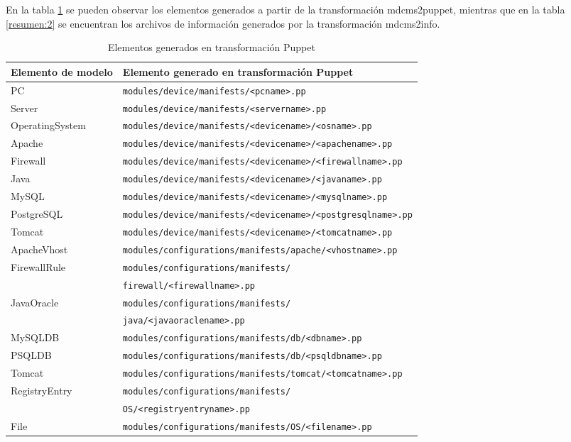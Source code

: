 En la tabla \ref{resumen:1} se pueden observar los elementos generados a partir de la transformación mdcms2puppet, mientras que en la tabla \ref{resumen:2} se encuentran los archivos de información generados por la transformación mdcms2info.
\begin{table}[htbp]
    \begin{adjustwidth}{-0.75in}{-0.5in}
        \centering
        \begin{center}
        \begin{tabular}{ll}
            Elemento de modelo & Elemento generado en transformación Puppet\\
            \hline
            PC & \texttt{modules/device/manifests/<pcname>.pp}\\
           Server & \texttt{modules/device/manifests/<servername>.pp}\\
            OperatingSystem & \texttt{modules/device/manifests/<devicename>/<osname>.pp}\\
           Apache & \texttt{modules/device/manifests/<devicename>/<apachename>.pp}\\
            Firewall & \texttt{modules/device/manifests/<devicename>/<firewallname>.pp}\\
            Java & \texttt{modules/device/manifests/<devicename>/<javaname>.pp}\\
            MySQL & \texttt{modules/device/manifests/<devicename>/<mysqlname>.pp}\\
            PostgreSQL & \texttt{modules/device/manifests/<devicename>/<postgresqlname>.pp}\\
            Tomcat & \texttt{modules/device/manifests/<devicename>/<tomcatname>.pp}\\
            ApacheVhost & \texttt{modules/configurations/manifests/apache/<vhostname>.pp}\\
            FirewallRule & \texttt{modules/configurations/manifests/}\\
            & \texttt{firewall/<firewallname>.pp}\\
            JavaOracle & \texttt{modules/configurations/manifests/}\\
            & \texttt{java/<javaoraclename>.pp}\\
            MySQLDB & \texttt{modules/configurations/manifests/db/<dbname>.pp}\\
            PSQLDB & \texttt{modules/configurations/manifests/db/<psqldbname>.pp}\\
            Tomcat & \texttt{modules/configurations/manifests/tomcat/<tomcatname>.pp}\\
            RegistryEntry & \texttt{modules/configurations/manifests/}\\
            & \texttt{OS/<registryentryname>.pp}\\
            File & \texttt{modules/configurations/manifests/OS/<filename>.pp}  \\
        \end{tabular}
        \caption{Elementos generados en transformación Puppet}\label{resumen:1}
        \end{center}
    \end{adjustwidth}
\end{table}


